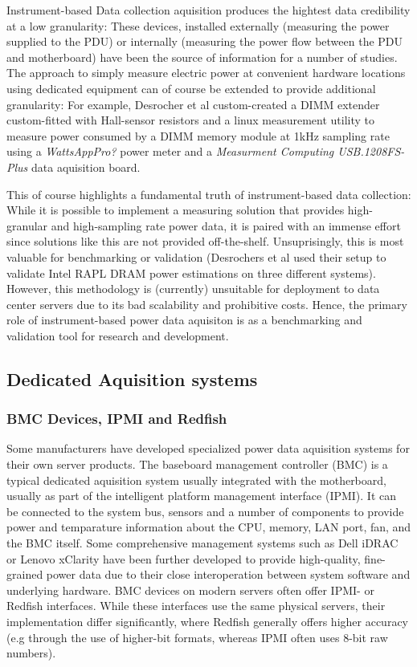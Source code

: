 Instrument-based Data collection aquisition produces the hightest data credibility at a low granularity: These devices, installed externally (measuring the power supplied to the PDU) or internally (measuring the power flow between the PDU and motherboard) have been the source of information for a number of studies. The approach to simply measure electric power at convenient hardware locations using dedicated equipment can of course be extended to provide additional granularity: For example, Desrocher et al\parencite{desrochers2016validation} custom-created a DIMM extender custom-fitted with Hall-sensor resistors and a linux measurement utility to measure power consumed by a DIMM memory module at 1kHz sampling rate using a \textit{WattsAppPro?} power meter and a \textit{Measurment Computing USB.1208FS-Plus} data aquisition board.

This of course highlights a fundamental truth of instrument-based data collection: While it is possible to implement a measuring solution that provides high-granular and high-sampling rate power data, it is paired with an immense effort since solutions like this are not provided off-the-shelf. Unsuprisingly, this is most valuable for benchmarking or validation (Desrochers et al used their setup to validate Intel RAPL DRAM power estimations on three different systems). However, this methodology is (currently) unsuitable for deployment to data center servers due to its bad scalability and prohibitive costs. Hence, the primary role of instrument-based power data aquisiton is as a benchmarking and validation tool for research and development.

\subsection{Dedicated Aquisition systems}

\subsubsection{BMC Devices, IPMI and Redfish}
\label{sec:BMC_devices}
Some manufacturers have developed specialized power data aquisition systems for their own server products. The baseboard management controller (BMC) is a typical dedicated aquisition system usually integrated with the motherboard, usually as part of the intelligent platform management interface (IPMI)\parencite{lin2020taxonomy}. It can be connected to the system bus, sensors and a number of components to provide power and temparature information about the CPU, memory, LAN port, fan, and the BMC itself. Some comprehensive management systems such as Dell iDRAC or Lenovo xClarity have been further developed to provide high-quality, fine-grained power data due to their close interoperation between system software and underlying hardware. BMC devices on modern servers often offer IPMI- or Redfish interfaces. While these interfaces use the same physical servers, their implementation differ significantly, where Redfish generally offers higher accuracy (e.g through the use of higher-bit formats, whereas IPMI often uses 8-bit raw numbers).

